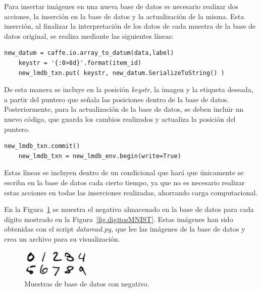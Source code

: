 Para insertar imágenes en una nueva base de datos es necesario realizar dos acciones, la inserción en la base de datos y la actualización de la misma. Esta inserción, al finalizar la interpretación de los datos de cada muestra de la base de datos original, se realiza mediante las siguientes líneas:
\vspace{10pt}
\begin{lstlisting}[frame=single]
	new_datum = caffe.io.array_to_datum(data,label)
	keystr = '{:0>8d}'.format(item_id)
	new_lmdb_txn.put( keystr, new_datum.SerializeToString() )
\end{lstlisting}

De esta manera se incluye en la posición \textit{keystr}, la imagen y la etiqueta deseada, a partir del puntero que señala las posiciones dentro de la base de datos.\\

Posteriormente, para la actualización de la base de datos, se deben incluir un nuevo código, que guarda los cambios realizados y actualiza la posición del puntero.
\vspace{10pt}
\begin{lstlisting}[frame=single]
	new_lmdb_txn.commit()
	new_lmdb_txn = new_lmdb_env.begin(write=True)
\end{lstlisting}

Estas líneas se incluyen dentro de un condicional que hará que únicamente se escriba en la base de datos cada cierto tiempo, ya que no es necesario realizar estas acciones en todas las inserciones realizadas, ahorrando carga computacional.\\
\vspace{20pt}

En la Figura~\ref{fig.neg} se muestra el negativo almacenado en la base de datos para cada dígito mostrado en la Figura~\ref{fig.digitosMNIST}. Estas imágenes han sido obtenidas con el script \textit{dataread.py}, que lee las imágenes de la base de datos y crea un archivo para su visualización.\\

\begin{figure}[H]
	\begin{center}
		\includegraphics[width=0.3\textwidth]{figures/negativo}
		\caption{Muestras de base de datos con negativo.}
		\label{fig.neg}
	\end{center}
\end{figure}

